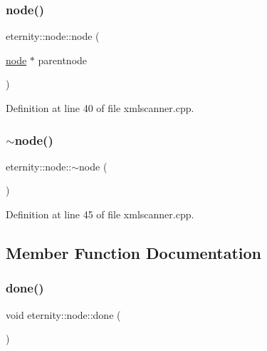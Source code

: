 \subsubsection{\texorpdfstring{node()}{node()}\hspace{0.1cm}{\footnotesize\ttfamily [3/3]}}
{\footnotesize\ttfamily eternity\+::node\+::node (\begin{DoxyParamCaption}\item[{\hyperlink{classeternity_1_1node}{node} $\ast$}]{parentnode }\end{DoxyParamCaption})}



Definition at line 40 of file xmlscanner.\+cpp.

\mbox{\label{classeternity_1_1node_a068bb1cebdb8ce5682040fe3ada60718}} 
\subsubsection{\texorpdfstring{$\sim$node()}{~node()}}
{\footnotesize\ttfamily eternity\+::node\+::$\sim$node (\begin{DoxyParamCaption}{ }\end{DoxyParamCaption})\hspace{0.3cm}{\ttfamily [virtual]}}



Definition at line 45 of file xmlscanner.\+cpp.



\subsection{Member Function Documentation}
\mbox{\label{classeternity_1_1node_acab0e3d272545fa2f535d11416119eaf}} 
\subsubsection{\texorpdfstring{done()}{done()}}
{\footnotesize\ttfamily void eternity\+::node\+::done (\begin{DoxyParamCaption}{ }\end{DoxyParamCaption})}



